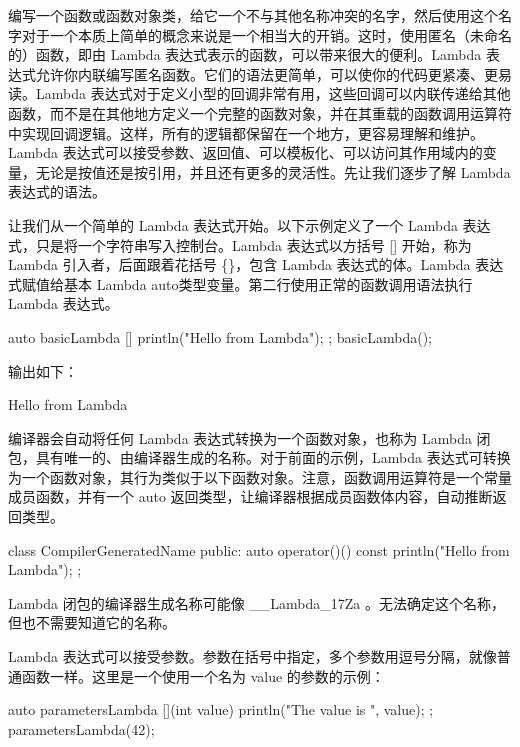 
编写一个函数或函数对象类，给它一个不与其他名称冲突的名字，然后使用这个名字对于一个本质上简单的概念来说是一个相当大的开销。这时，使用匿名（未命名的）函数，即由 Lambda 表达式表示的函数，可以带来很大的便利。Lambda 表达式允许你内联编写匿名函数。它们的语法更简单，可以使你的代码更紧凑、更易读。Lambda 表达式对于定义小型的回调非常有用，这些回调可以内联传递给其他函数，而不是在其他地方定义一个完整的函数对象，并在其重载的函数调用运算符中实现回调逻辑。这样，所有的逻辑都保留在一个地方，更容易理解和维护。Lambda 表达式可以接受参数、返回值、可以模板化、可以访问其作用域内的变量，无论是按值还是按引用，并且还有更多的灵活性。先让我们逐步了解 Lambda 表达式的语法。


让我们从一个简单的 Lambda 表达式开始。以下示例定义了一个 Lambda 表达式，只是将一个字符串写入控制台。Lambda 表达式以方括号 [] 开始，称为 Lambda 引入者，后面跟着花括号 \{\}，包含 Lambda 表达式的体。Lambda 表达式赋值给基本 Lambda auto类型变量。第二行使用正常的函数调用语法执行 Lambda 表达式。

\begin{cpp}
auto basicLambda { []{ println("Hello from Lambda"); } };
basicLambda();
\end{cpp}

输出如下：

\begin{shell}
Hello from Lambda
\end{shell}

编译器会自动将任何 Lambda 表达式转换为一个函数对象，也称为 Lambda 闭包，具有唯一的、由编译器生成的名称。对于前面的示例，Lambda 表达式可转换为一个函数对象，其行为类似于以下函数对象。注意，函数调用运算符是一个常量成员函数，并有一个 auto 返回类型，让编译器根据成员函数体内容，自动推断返回类型。

\begin{cpp}
class CompilerGeneratedName
{
    public:
        auto operator()() const { println("Hello from Lambda"); }
};
\end{cpp}

Lambda 闭包的编译器生成名称可能像 \_\_Lambda\_17Za 。无法确定这个名称，但也不需要知道它的名称。

Lambda 表达式可以接受参数。参数在括号中指定，多个参数用逗号分隔，就像普通函数一样。这里是一个使用一个名为 value 的参数的示例：

\begin{cpp}
auto parametersLambda { [](int value){ println("The value is {}", value); } };
parametersLambda(42);
\end{cpp}

